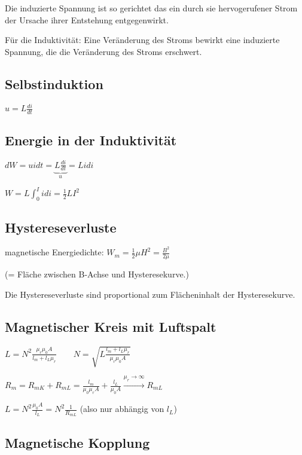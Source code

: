 \documentclass[10pt,a4paper]{scrartcl}
\begin{document}
\begin{multicols*}{3}
	Die induzierte Spannung ist so gerichtet das ein durch sie hervogerufener Strom der Ursache ihrer Entstehung entgegenwirkt.
	
	Für die Induktivität: Eine Veränderung des Stroms bewirkt eine induzierte Spannung, die die Veränderung des Stroms erschwert.
	
	
	\subsection{Selbstinduktion}
	
	$u=L\frac{di}{dt}$
	
	
	\subsection{Energie in der Induktivität}
	
	$dW=uidt=\underbrace{L\frac{di}{dt}}_{u}=Lidi$	
	
	$W=L\int_0^I{idi}=\frac{1}{2}LI^2$
	
	 
	
	\subsection{Hystereseverluste}
	
	magnetische Energiedichte: $W_m=\frac{1}{2}\mu H^2=\frac{B^2}{2\mu}$ 
	
	\small(= Fläche zwischen B-Achse und Hysteresekurve.)\normalsize
	
	Die Hystereseverluste sind proportional zum Flächeninhalt der Hysteresekurve.
	
	 
	
	\subsection{Magnetischer Kreis mit Luftspalt}
	
	$L=N^2\frac{\mu_r\mu_0A}{l_m+l_L\mu_r}\qquad N=\sqrt{L\frac{l_m+l_L\mu_r}{\mu_r\mu_0 A}}$	
	
	\finn
	
	$R_m=R_{mK}+R_{mL}=\frac{l_m}{\mu_0\mu_r A}+\frac{l_L}{\mu_0 A}\overset{\mu_r\rightarrow\infty}{\longrightarrow}R_{mL}$
	
	$L = N^2\frac{\mu_0A}{l_L}=N^2\frac{1}{R_{mL}}$ \footnotesize (also nur abhängig von $l_L$)\normalsize	
	
	 
	
	\subsection{Magnetische Kopplung}
	

\end{multicols*}
\end{document}
